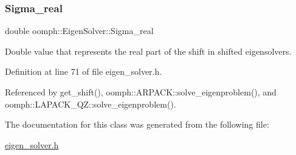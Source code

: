 \subsubsection{\texorpdfstring{Sigma\+\_\+real}{Sigma\_real}}
{\footnotesize\ttfamily double oomph\+::\+Eigen\+Solver\+::\+Sigma\+\_\+real\hspace{0.3cm}{\ttfamily [protected]}}



Double value that represents the real part of the shift in shifted eigensolvers. 



Definition at line 71 of file eigen\+\_\+solver.\+h.



Referenced by get\+\_\+shift(), oomph\+::\+A\+R\+P\+A\+C\+K\+::solve\+\_\+eigenproblem(), and oomph\+::\+L\+A\+P\+A\+C\+K\+\_\+\+Q\+Z\+::solve\+\_\+eigenproblem().



The documentation for this class was generated from the following file\+:\begin{DoxyCompactItemize}
\item 
\hyperlink{eigen__solver_8h}{eigen\+\_\+solver.\+h}\end{DoxyCompactItemize}
